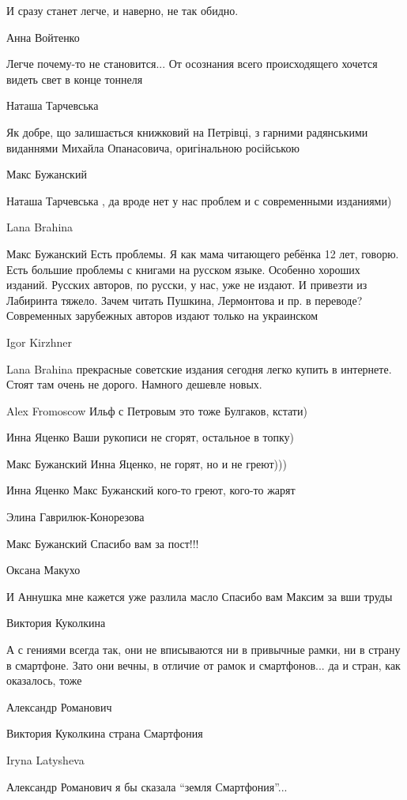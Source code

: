 И сразу станет легче, и наверно, не так обидно.

Анна Войтенко

Легче почему-то не становится... От осознания всего происходящего хочется видеть свет в конце тоннеля

Наташа Тарчевська

Як добре, що залишається книжковий на Петрівці, з гарними радянськими виданнями Михайла Опанасовича, оригінальною російською

Макс Бужанский

Наташа Тарчевська , да вроде нет у нас проблем и с современными изданиями)

Lana Brahina

Макс Бужанский
Есть проблемы.
Я как мама читающего ребёнка 12 лет, говорю. Есть большие проблемы с книгами на
русском языке. Особенно хороших изданий. Русских авторов, по русски, у нас, уже
не издают. И привезти из Лабиринта тяжело.  Зачем читать Пушкина, Лермонтова и
пр. в переводе?  Современных зарубежных авторов издают только на украинском

Igor Kirzhner

Lana Brahina прекрасные советские издания сегодня легко купить в интернете. Стоят там очень не дорого. Намного дешевле новых.

Alex Fromoscow
Ильф с Петровым это тоже Булгаков, кстати)

Инна Яценко
Ваши рукописи не сгорят, остальное в топку)

Макс Бужанский
Инна Яценко, не горят, но и не греют)))

Инна Яценко
Макс Бужанский кого-то греют, кого-то жарят

Элина Гаврилюк-Конорезова

Макс Бужанский Спасибо вам за пост!!!

Оксана Макухо

И Аннушка мне кажется уже разлила масло Спасибо вам Максим за вши труды

Виктория Куколкина

А с гениями всегда так, они не вписываются ни в привычные рамки, ни в страну в
смартфоне. Зато они вечны, в отличие от рамок и смартфонов... да и стран, как
оказалось, тоже

Александр Романович

Виктория Куколкина страна Смартфония

Iryna Latysheva

Александр Романович я бы сказала \enquote{земля Смартфония}...

